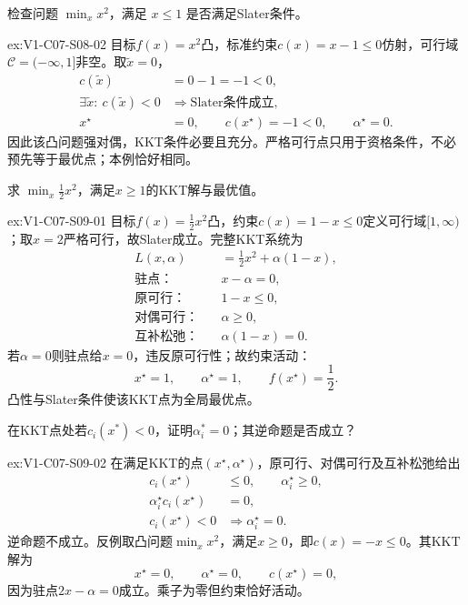 \begin{SLChapterExercisePairSection}
\begin{exercise}\label{ex:V1-C07-S08-02}
检查问题 $\min_x x^2$，满足 $x\le1$ 是否满足Slater条件。
\end{exercise}
\label{sol:V1-C07-S08-02}
\begin{chapterexercisesolution}{ex:V1-C07-S08-02}
目标$f(x)=x^2$凸，标准约束$c(x)=x-1\le0$仿射，可行域$\mathcal C=(-\infty,1]$非空。取$\widetilde x=0$，
\[
\begin{aligned}
c(\widetilde x)&=0-1=-1<0,\\
\exists\widetilde x:\ c(\widetilde x)<0
&\Longrightarrow \text{Slater条件成立},\\
x^\star&=0,\qquad c(x^\star)=-1<0,\qquad \alpha^\star=0.
\end{aligned}
\]
因此该凸问题强对偶，KKT条件必要且充分。严格可行点只用于资格条件，不必预先等于最优点；本例恰好相同。
\end{chapterexercisesolution}

\begin{exercise}\label{ex:V1-C07-S09-01}
求 $\min_x\tfrac12x^2$，满足$x\ge1$的KKT解与最优值。
\end{exercise}
\label{sol:V1-C07-S09-01}
\begin{chapterexercisesolution}{ex:V1-C07-S09-01}
目标$f(x)=\tfrac12x^2$凸，约束$c(x)=1-x\le0$定义可行域$[1,\infty)$；取$x=2$严格可行，故Slater成立。完整KKT系统为
\[
\begin{aligned}
L(x,\alpha)&=\frac12x^2+\alpha(1-x),\\
\text{驻点：}\quad &x-\alpha=0,\\
\text{原可行：}\quad &1-x\le0,\\
\text{对偶可行：}\quad &\alpha\ge0,\\
\text{互补松弛：}\quad &\alpha(1-x)=0.
\end{aligned}
\]
若$\alpha=0$则驻点给$x=0$，违反原可行性；故约束活动：
\[
x^\star=1,\qquad \alpha^\star=1,\qquad f(x^\star)=\frac12.
\]
凸性与Slater条件使该KKT点为全局最优点。
\end{chapterexercisesolution}

\begin{exercise}\label{ex:V1-C07-S09-02}
在KKT点处若$c_i(x^*)<0$，证明$\alpha_i^*=0$；其逆命题是否成立？
\end{exercise}
\label{sol:V1-C07-S09-02}
\begin{chapterexercisesolution}{ex:V1-C07-S09-02}
在满足KKT的点$(x^\star,\alpha^\star)$，原可行、对偶可行及互补松弛给出
\[
\begin{aligned}
c_i(x^\star)&\le0,\qquad \alpha_i^\star\ge0,\\
\alpha_i^\star c_i(x^\star)&=0,\\
c_i(x^\star)<0&\Longrightarrow \alpha_i^\star=0.
\end{aligned}
\]
逆命题不成立。反例取凸问题$\min_x x^2$，满足$x\ge0$，即$c(x)=-x\le0$。其KKT解为
\[
x^\star=0,\qquad
\alpha^\star=0,\qquad
c(x^\star)=0,
\]
因为驻点$2x-\alpha=0$成立。乘子为零但约束恰好活动。
\end{chapterexercisesolution}


\end{SLChapterExercisePairSection}
